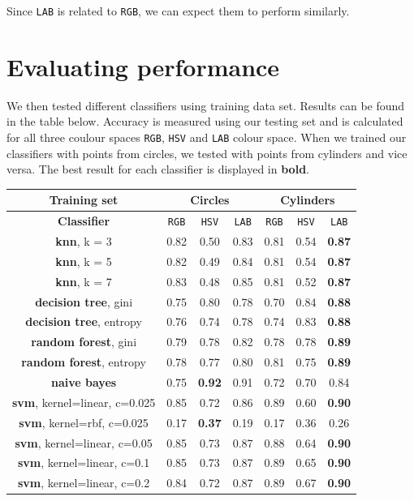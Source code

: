 \documentclass[12pt,a4paper]{article}
\begin{document}
	Since \texttt{LAB} is related to \texttt{RGB}, we can expect them to perform similarly.

	\section{Evaluating performance}

	We then tested different classifiers using training data set. Results can be found in the table below. Accuracy is measured using our testing set and is calculated for all three coulour spaces \texttt{RGB}, \texttt{HSV} and \texttt{LAB} colour space. When we trained our classifiers with points from circles, we tested with points from cylinders and vice versa. The best result for each classifier is displayed in \textbf{bold}.
	
	\begin{center}
		\begin{tabular}{|c|c|c|c||c|c|c|}
			\hline
			Training set & \multicolumn{3}{c||}{\textbf{Circles}} & \multicolumn{3}{c|}{\textbf{Cylinders}} \\
			\hline
			\hline 
			\textbf{Classifier} & \texttt{RGB} & \texttt{HSV} & \texttt{LAB} & \texttt{RGB} & \texttt{HSV} & \texttt{LAB} \\
			\hline \hline
			\textbf{knn}, \small k = 3 & 0.82 & 0.50 & 0.83 & 0.81 & 0.54 & \textbf{0.87} \\
			\textbf{knn}, \small k = 5 & 0.82 & 0.49 & 0.84 & 0.81 & 0.54 & \textbf{0.87} \\
			\textbf{knn}, \small k = 7 & 0.83 & 0.48 & 0.85 & 0.81 & 0.52 & \textbf{0.87} \\
			\hline \hline
			\textbf{decision tree}, \small gini & 0.75 & 0.80 & 0.78 & 0.70 & 0.84 & \textbf{0.88} \\
			\textbf{decision tree}, \small entropy & 0.76 & 0.74 & 0.78 & 0.74 & 0.83 & \textbf{0.88} \\
			\hline \hline
			\textbf{random forest}, \small gini & 0.79 & 0.78 & 0.82 & 0.78 & 0.78 & \textbf{0.89} \\
			\textbf{random forest}, \small entropy & 0.78 & 0.77 & 0.80 & 0.81 & 0.75 & \textbf{0.89} \\
			\hline \hline
			\textbf{naive bayes} & 0.75 & \textbf{0.92} & 0.91 & 0.72 & 0.70 & 0.84 \\
			\hline \hline
			\textbf{svm}, \small kernel=linear, c=0.025 & 0.85 & 0.72 & 0.86 & 0.89 & 0.60 & \textbf{0.90} \\
			\textbf{svm}, \small kernel=rbf, c=0.025 & 0.17 & \textbf{0.37} & 0.19 & 0.17 & 0.36 & 0.26 \\
			\textbf{svm}, \small kernel=linear, c=0.05 & 0.85 & 0.73 & 0.87 & 0.88 & 0.64 & \textbf{0.90} \\
			\textbf{svm}, \small kernel=linear, c=0.1 & 0.85 & 0.73 & 0.87 & 0.89 & 0.65 & \textbf{0.90} \\
			\textbf{svm}, \small kernel=linear, c=0.2 & 0.84 & 0.72 & 0.87 & 0.89 & 0.67 & \textbf{0.90} \\
			\hline
		\end{tabular} \\
	\end{center}
\end{document}
